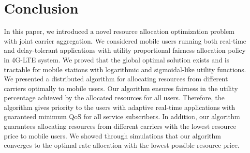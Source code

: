 \documentclass[conference]{IEEEtran}
\begin{document}
\section{Conclusion}\label{sec:conclude}
In this paper, we introduced a novel resource allocation optimization problem with joint carrier aggregation. We considered mobile users running both real-time and delay-tolerant applications with utility proportional fairness allocation policy in 4G-LTE system. We proved that the global optimal solution exists and is tractable for mobile stations with logarithmic and sigmoidal-like utility functions. We presented a distributed algorithm for allocating resources from different carriers optimally to mobile users. Our algorithm ensures fairness in the utility percentage achieved by the allocated resources for all users. Therefore, the algorithm gives priority to the users with adaptive real-time applications with guaranteed minimum QoS for all service subscribers. In addition, our algorithm guarantees allocating resources from different carriers with the lowest resource price to mobile users. We showed through simulations that our algorithm converges to the optimal rate allocation with the lowest possible 
resource price.



\end{document}
